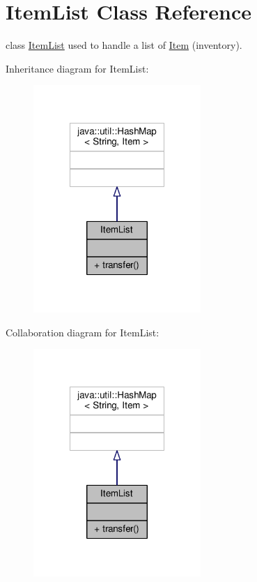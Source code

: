 \hypertarget{classItemList}{\section{Item\-List Class Reference}
\label{classItemList}
}


class \hyperlink{classItemList}{Item\-List} used to handle a list of \hyperlink{classItem}{Item} (inventory).  




Inheritance diagram for Item\-List\-:
\nopagebreak
\begin{figure}[H]
\begin{center}
\leavevmode
\includegraphics[width=180pt]{classItemList__inherit__graph}
\end{center}
\end{figure}


Collaboration diagram for Item\-List\-:
\nopagebreak
\begin{figure}[H]
\begin{center}
\leavevmode
\includegraphics[width=180pt]{classItemList__coll__graph}
\end{center}
\end{figure}
